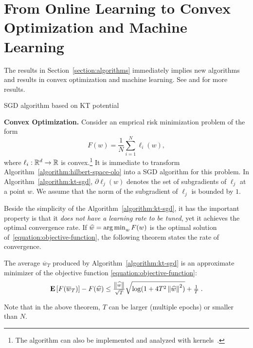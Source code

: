\section{From Online Learning to Convex Optimization and Machine Learning}
\label{section:applications}

The results in Section~\ref{section:algorithms} immediately implies new
algorithms and results in convex optimization and machine learning. See
\cite{Orabona-2014} and \cite{Luo-Schapire-2015} for more results.

\begin{algorithm}[t]
\caption{SGD algorithm based on KT potential \label{algorithm:kt-sgd}}
\begin{algorithmic}[1]
{
\ENDFOR
{}
}
\end{algorithmic}
\end{algorithm}

\textbf{Convex Optimization.}
Consider an emprical risk minimization problem of the form
%
\begin{equation}
\label{equation:objective-function}
F(w) = \frac{1}{N} \sum_{i=1}^N \ell_i(w),
\end{equation}
%
where $\ell_i:\mathbb{R}^d \to \mathbb{R}$ is convex.\footnote{The algorithm can also be
implemented and analyzed with kernels~\citep{Orabona-2014}.} It is immediate to
transform Algorithm~\ref{algorithm:hilbert-space-olo} into a \ac{SGD} algorithm
for this problem. In Algorithm~\ref{algorithm:kt-sgd}, $\partial\ell_j(w)$
denotes the set of subgradients of $\ell_j$ at a point $w$.  We assume that the
norm of the subgradient of $\ell_j$ is bounded by $1$.

Beside the simplicity of the Algorithm~\ref{algorithm:kt-sgd}, it has the
important property is that it \emph{does not have a learning rate to be tuned},
yet it achieves the optimal convergence rate. If $\widehat{w} = \operatorname*{arg\,min}_w F(w)$
is the optimal solution of~\eqref{equation:objective-function}, the following
theorem states the rate of convergence.
%
\begin{theorem}
The average $\overline{w}_T$ produced by Algorithm~\ref{algorithm:kt-sgd} is
an approximate minimizer of the objective function \eqref{equation:objective-function}:
\[
\operatorname*{\mathbf{E}}\left[F(\overline{w}_T)\right] - F(\widehat{w}) \leq \tfrac{\left\|{\widehat{w}}\right\|}{\sqrt{T}} \sqrt{\log(1+4 T^2 \left\|{\widehat{w}}\right\|^2)} +\tfrac{1}{T} \; .
\]
\end{theorem}
%
Note that in the above theorem, $T$ can be larger (multiple epochs) or smaller
than $N$.

